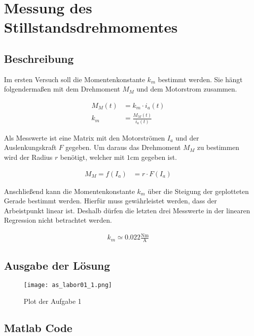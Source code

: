 \section{Messung des Stillstandsdrehmomentes}

\subsection{Beschreibung}

Im ersten Versuch soll die Momentenkonstante $k_m$ bestimmt werden.
Sie hängt folgendermaßen mit dem Drehmoment $M_M$ und dem Motorstrom
zusammen. 

\begin{equation} \label{eq1}
    \begin{split}
        M_M(t)&=k_m \cdot i_a(t)\\
        k_m&=\frac{M_M(t)}{i_a(t)}
    \end{split}
\end{equation}

Als Messwerte ist eine Matrix mit den Motorströmen $I_a$ und der Auslenkungskraft
$F$ gegeben. Um daraus das Drehmoment $M_M$ zu bestimmen wird der Radius $r$
benötigt, welcher mit $1 \mathrm{cm}$ gegeben ist.

\begin{equation} \label{eq2}
    \begin{split}
        M_M=f(I_a)&=r \cdot F(I_a)
    \end{split}
\end{equation}

Anschließend kann die Momentenkonstante $k_m$ über die Steigung der geplotteten
Gerade bestimmt werden. Hierfür muss gewährleistet werden, dass der Arbeistpunkt
linear ist. Deshalb dürfen die letzten drei Messwerte in der linearen Regression
nicht betrachtet werden.

\begin{equation} \label{eq3}
    \begin{split}
        k_m\simeq 0.022 \mathrm{\frac{Nm}{A}}
    \end{split}
\end{equation}






\subsection{Ausgabe der Lösung}
\begin{figure}[htp]
 \centering
 \texttt{[image: as\_labor01\_1.png]}
 \caption{Plot der Aufgabe 1}
 \label{fig:PlotAufgabe1}
\end{figure}

\subsection{Matlab Code}

